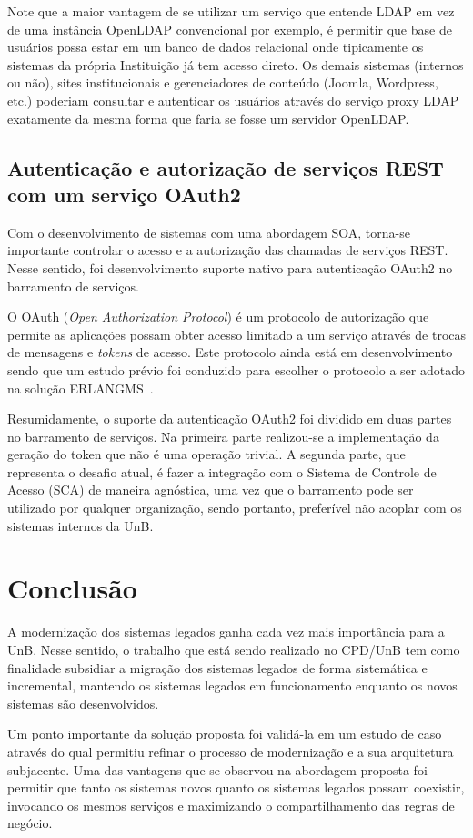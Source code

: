 \documentclass[12pt]{article}
\begin{document}
Note que a maior vantagem de se utilizar um serviço que entende LDAP
em vez de uma instância OpenLDAP convencional por exemplo, 
é permitir que base de usuários possa
estar em um banco de dados relacional onde tipicamente os sistemas da própria Instituição
já tem acesso direto. Os demais sistemas (internos ou não), sites institucionais 
e gerenciadores de conteúdo (Joomla, Wordpress, etc.)
poderiam consultar e autenticar os usuários através do serviço proxy LDAP 
exatamente da mesma forma que faria se fosse um servidor OpenLDAP.



\subsection{Autenticação e autorização de serviços REST com um serviço OAuth2}\label{oauth2}

Com o desenvolvimento de sistemas com uma abordagem SOA, torna-se
importante controlar o acesso e a autorização das chamadas de serviços REST.
Nesse sentido, foi desenvolvimento suporte nativo para autenticação OAuth2
no barramento de serviços. 


O OAuth (\textit{Open Authorization Protocol}) é um protocolo de autorização 
que permite as aplicações possam obter 
acesso limitado a um serviço através de trocas de 
mensagens e \textit{tokens} de acesso. 
Este protocolo ainda está em desenvolvimento sendo que 
um estudo prévio foi conduzido para escolher o protocolo a ser adotado
na solução ERLANGMS~\cite{7521451}.


Resumidamente, o suporte da autenticação OAuth2 foi dividido em duas partes no barramento de serviços.
Na primeira parte realizou-se a implementação
da geração do token que não é uma operação trivial.
A segunda parte, que representa 
o desafio atual, é fazer a integração com o Sistema de Controle de Acesso (SCA)
de maneira agnóstica, uma vez que o barramento pode ser utilizado 
por qualquer organização, sendo portanto, preferível não acoplar com 
os sistemas internos da UnB.




\section{Conclusão}

A modernização dos sistemas legados ganha cada vez mais importância
para a UnB.
Nesse sentido, o trabalho que está sendo realizado
no CPD/UnB tem como finalidade subsidiar
a migração
dos sistemas legados de forma sistemática 
e incremental, mantendo os sistemas legados
em funcionamento enquanto os novos sistemas
são desenvolvidos.

Um ponto importante
da solução proposta foi validá-la em um estudo de caso
através do qual permitiu refinar o processo de modernização e a 
sua arquitetura subjacente.
Uma das vantagens que se observou na abordagem proposta foi permitir que tanto 
os sistemas novos quanto os sistemas legados possam coexistir, invocando os mesmos serviços e
maximizando o compartilhamento das regras de negócio.




\end{document}
